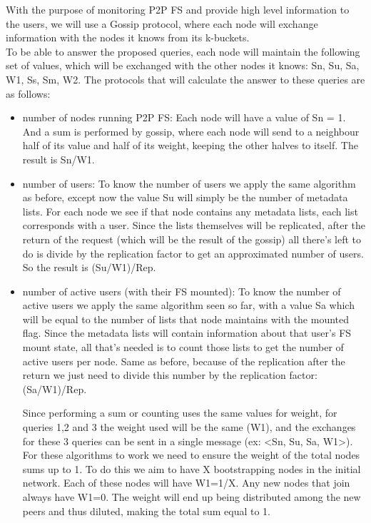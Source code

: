 \documentclass[times,9pt,article]{llncs}
\begin{document}
With the purpose of monitoring P2P FS and provide high level information to the 
users, we will use a Gossip protocol, where each node will exchange information
with the nodes it knows from its k-buckets.\\
To be able to answer the proposed queries, each node will maintain the following
set of values, which will be exchanged with the other nodes it knows: Sn, Su, Sa,
W1, Ss, Sm, W2. The protocols that will calculate the answer to these queries are
as follows:
\begin{itemize}
\item number of nodes running P2P FS:
Each node will have a value of Sn = 1. And a sum is performed by gossip, where each 
node will send to a neighbour half of its value and half of its weight, keeping the 
other halves to itself. The result is Sn/W1.

\item number of users:
To know the number of users we apply the same algorithm as before, except now 
the value Su will simply be the number of metadata lists. For each node we see if
that node contains any metadata lists, each list corresponds with a user. Since 
the lists themselves will be replicated, after the return of the request (which will
be the result of the gossip) all there's left to do is divide by the replication 
factor to get an approximated number of users. So the result is (Su/W1)/Rep.

\item number of active users (with their FS mounted):
To know the number of active users we apply the same algorithm seen so far, with a
value Sa which will be equal to the number of lists that node maintains with the
mounted flag. Since the metadata lists will contain information about that user's
FS mount state, all that's needed is to count those lists to get the number of
active users per node. Same as before, because of the replication after the return
we just need to divide this number by the replication factor: (Sa/W1)/Rep.

Since performing a sum or counting uses the same values for weight, for queries 1,2 
and 3 the weight used will be the same (W1), and the exchanges for these 3 queries 
can be sent in a single message (ex: \textless Sn, Su, Sa, W1\textgreater). For these algorithms to work 
we need to ensure the weight of the total nodes sums up to 1. To do this we aim to
have X bootstrapping nodes in the initial network. Each of these nodes will have 
W1=1/X. 
Any new nodes that join always have W1=0. The weight will end up being distributed 
among the new peers and thus diluted, making the total sum equal to 1.


\end{itemize}
\end{document}
